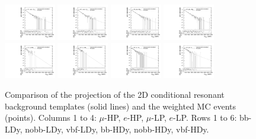 \begin{figure}[htbp]
  \includegraphics[width=0.2\textwidth]{fig/2Dfit/templateVsReco_res_r0_MVV_mu_HP_nobb_HDy.pdf}
  \includegraphics[width=0.2\textwidth]{fig/2Dfit/templateVsReco_res_r0_MVV_e_HP_nobb_HDy.pdf}
  \includegraphics[width=0.2\textwidth]{fig/2Dfit/templateVsReco_res_r0_MVV_mu_LP_nobb_HDy.pdf}
  \includegraphics[width=0.2\textwidth]{fig/2Dfit/templateVsReco_res_r0_MVV_e_LP_nobb_HDy.pdf}\\
  \includegraphics[width=0.2\textwidth]{fig/2Dfit/templateVsReco_res_r0_MVV_mu_HP_vbf_HDy.pdf}
  \includegraphics[width=0.2\textwidth]{fig/2Dfit/templateVsReco_res_r0_MVV_e_HP_vbf_HDy.pdf}
  \includegraphics[width=0.2\textwidth]{fig/2Dfit/templateVsReco_res_r0_MVV_mu_LP_vbf_HDy.pdf}
  \includegraphics[width=0.2\textwidth]{fig/2Dfit/templateVsReco_res_r0_MVV_e_LP_vbf_HDy.pdf}\\
  \caption{
    Comparison of the \MVV projection of the 2D conditional resonant background templates (solid lines) and the weighted MC events (points).
    Columns 1 to 4: $\mu$-HP, $e$-HP, $\mu$-LP, $e$-LP.
    Rows 1 to 6: bb-LDy, nobb-LDy, vbf-LDy, bb-HDy, nobb-HDy, vbf-HDy.
  }
  \label{fig:condTemplateVscondReco_res_MVV_Run2}
\end{figure}

